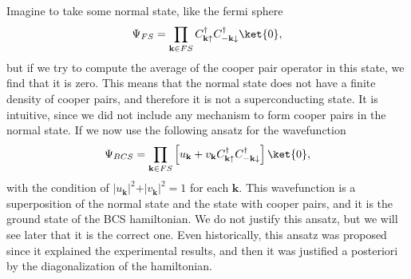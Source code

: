 Imagine to take some normal state, like the fermi sphere
\[
    \Psi_{FS} = \prod_{\mathbf{k} \in FS} C^{\dagger}_{\mathbf{k} \uparrow} C^{\dagger}_{-\mathbf{k} \downarrow} \ket{0},
\]
but if we try to compute the average of the cooper pair operator in this state, we find that it is zero. This means that the normal state does not have a finite density of cooper pairs, and therefore it is not a superconducting state. It is intuitive, since we did not include any mechanism to form cooper pairs in the normal state. If we now use the following ansatz for the wavefunction
\[
    \Psi_{BCS} = \prod_{\mathbf{k} \in FS} \left[u_{\mathbf{k}} + v_{\mathbf{k}} C^{\dagger}_{\mathbf{k} \uparrow} C^{\dagger}_{-\mathbf{k} \downarrow} \right] \ket{0},
\]
with the condition of \(\vert u_{\mathbf{k}} \vert^2 + \vert v_{\mathbf{k}} \vert^2 = 1\) for each \(\mathbf{k}\). This wavefunction is a superposition of the normal state and the state with cooper pairs, and it is the ground state of the BCS hamiltonian. We do not justify this ansatz, but we will see later that it is the correct one. Even historically, this ansatz was proposed since it explained the experimental results, and then it was justified a posteriori by the diagonalization of the hamiltonian.

